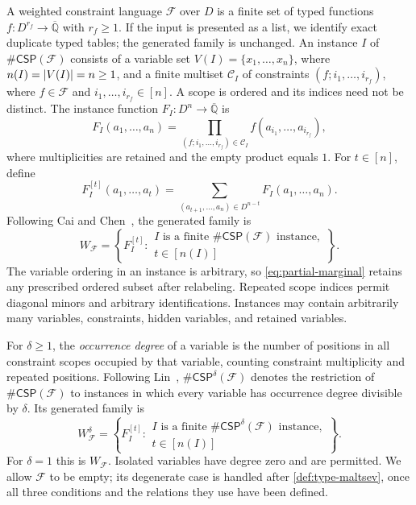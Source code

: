 \documentclass[11pt]{article}
\theoremstyle{plain}
\theoremstyle{definition}
\theoremstyle{remark}
\newcommand{\AlgNums}{\overline{\mathbb Q}}
\newcommand{\cF}{\mathcal F}
\newcommand{\CSP}[1]{\mathsf{\#CSP}(#1)}
\newcommand{\CSPdeg}[2]{\mathsf{\#CSP}^{#1}(#2)}
\newcommand{\WFdeg}[1]{W_{\cF}^{#1}}
\DeclarePairedDelimiter{\abs}{\lvert}{\rvert}
\begin{document}
A weighted constraint language $\cF$ over $D$ is a finite set of typed
functions $f:D^{r_f}\to\AlgNums$ with $r_f\ge1$.  If the input
is presented as a list, we identify exact duplicate typed tables; the
generated family is unchanged.  An instance $I$ of
$\CSP{\cF}$ consists of a variable set
$V(I)=\{x_1,\ldots,x_n\}$, where $n(I)=\abs{V(I)}=n\ge1$, and a finite
multiset $\mathcal C_I$ of constraints $(f;i_1,\ldots,i_{r_f})$, where
$f\in\cF$ and $i_1,\ldots,i_{r_f}\in[n]$.  A scope is ordered and its
indices need not be distinct.  The instance function $F_I:D^n\to\AlgNums$
is
\begin{equation}
  F_I(a_1,\ldots,a_n)
  =\prod_{(f;i_1,\ldots,i_{r_f})\in\mathcal C_I}
      f(a_{i_1},\ldots,a_{i_{r_f}}),
  \label{eq:instance-function}
\end{equation}
where multiplicities are retained and the empty product equals $1$.
For $t\in[n]$, define
\begin{equation}
  F_I^{[t]}(a_1,\ldots,a_t)
  =\sum_{(a_{t+1},\ldots,a_n)\in D^{n-t}}
      F_I(a_1,\ldots,a_n).
  \label{eq:partial-marginal}
\end{equation}
Following Cai and Chen~\cite{CaiChen2017}, the generated family is
\begin{equation*}
  W_{\cF}
  =\left\{F_I^{[t]}:
    \begin{array}{l}
      I\text{ is a finite }\CSP{\cF}\text{ instance},\\
      t\in[n(I)]
    \end{array}
    \right\}.
\end{equation*}
The variable ordering in an instance is arbitrary, so
\eqref{eq:partial-marginal} retains any prescribed ordered subset after
relabeling.  Repeated scope indices permit diagonal minors and arbitrary
identifications.  Instances may contain arbitrarily many variables,
constraints, hidden variables, and retained variables.

For $\delta\ge1$, the \emph{occurrence degree} of a variable is the number
of positions in all constraint scopes occupied by that variable, counting
constraint multiplicity and repeated positions.  Following
Lin~\cite{Lin2021}, $\CSPdeg{\delta}{\cF}$ denotes the restriction of
$\CSP{\cF}$ to instances in which every variable has occurrence degree
divisible by $\delta$.  Its
generated family is
\begin{equation*}
  \WFdeg{\delta}
  =\left\{F_I^{[t]}:
    \begin{array}{l}
      I\text{ is a finite }\CSPdeg{\delta}{\cF}\text{ instance},\\
      t\in[n(I)]
    \end{array}
    \right\}.
\end{equation*}
For $\delta=1$ this is $W_{\cF}$.  Isolated variables have degree zero and
are permitted.  We allow $\cF$ to be empty; its degenerate case is handled
after \cref{def:type-maltsev}, once all three conditions and the relations
they use have been defined.
\end{document}
